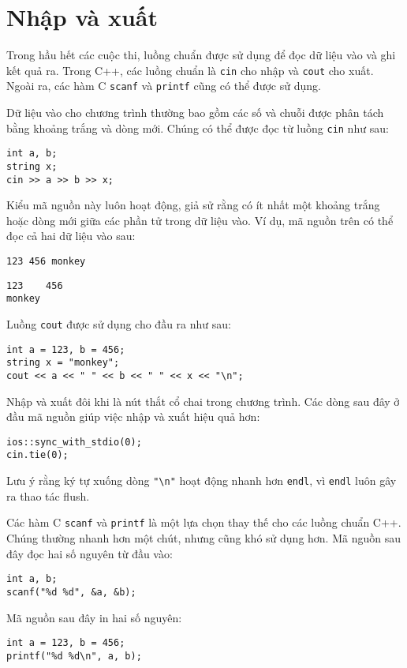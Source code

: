 \section{Nhập và xuất}


Trong hầu hết các cuộc thi, luồng chuẩn được sử dụng để
đọc dữ liệu vào và ghi kết quả ra.
Trong C++, các luồng chuẩn là
\texttt{cin} cho nhập và \texttt{cout} cho xuất.
Ngoài ra, các hàm C
\texttt{scanf} và \texttt{printf} cũng có thể được sử dụng.

Dữ liệu vào cho chương trình thường bao gồm
các số và chuỗi được phân tách bằng
khoảng trắng và dòng mới.
Chúng có thể được đọc từ luồng \texttt{cin}
như sau:

\begin{lstlisting}
int a, b;
string x;
cin >> a >> b >> x;
\end{lstlisting}

Kiểu mã nguồn này luôn hoạt động,
giả sử rằng có ít nhất một khoảng trắng
hoặc dòng mới giữa các phần tử trong dữ liệu vào.
Ví dụ, mã nguồn trên có thể đọc
cả hai dữ liệu vào sau:
\begin{lstlisting}
123 456 monkey
\end{lstlisting}
\begin{lstlisting}
123    456
monkey
\end{lstlisting}
Luồng \texttt{cout} được sử dụng cho đầu ra
như sau:
\begin{lstlisting}
int a = 123, b = 456;
string x = "monkey";
cout << a << " " << b << " " << x << "\n";
\end{lstlisting}

Nhập và xuất đôi khi là
nút thắt cổ chai trong chương trình.
Các dòng sau đây ở đầu mã nguồn
giúp việc nhập và xuất hiệu quả hơn:

\begin{lstlisting}
ios::sync_with_stdio(0);
cin.tie(0);
\end{lstlisting}

Lưu ý rằng ký tự xuống dòng \texttt{"\textbackslash n"}
hoạt động nhanh hơn \texttt{endl},
vì \texttt{endl} luôn gây ra
thao tác flush.

Các hàm C \texttt{scanf}
và \texttt{printf} là một lựa chọn thay thế
cho các luồng chuẩn C++.
Chúng thường nhanh hơn một chút,
nhưng cũng khó sử dụng hơn.
Mã nguồn sau đây đọc hai số nguyên từ đầu vào:
\begin{lstlisting}
int a, b;
scanf("%d %d", &a, &b);
\end{lstlisting}
Mã nguồn sau đây in hai số nguyên:
\begin{lstlisting}
int a = 123, b = 456;
printf("%d %d\n", a, b);
\end{lstlisting}

